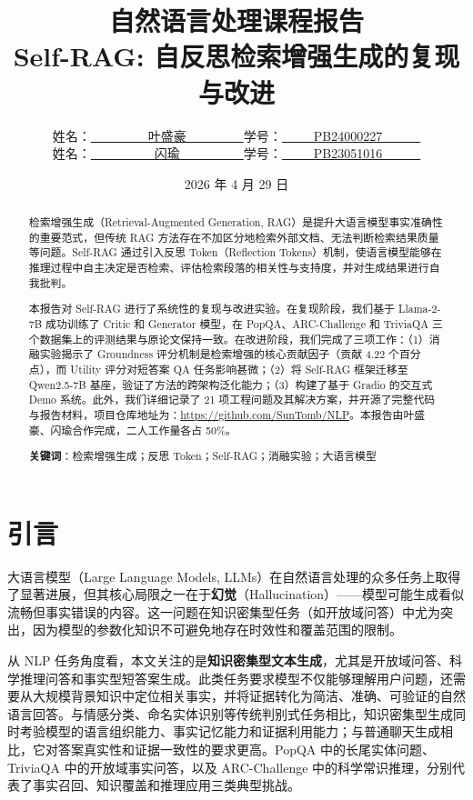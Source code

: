 \documentclass[11pt,a4paper]{article}
\title{\bf 自然语言处理课程报告\\[0.5em]
\Large Self-RAG: 自反思检索增强生成的复现与改进}
\author{\begin{tabular}{cc}
姓名：\underline{~~~~~~~~~叶盛豪~~~~~~~~~} & 学号：\underline{~~~~~PB24000227~~~~~~} \\
姓名：\underline{~~~~~~~~~~闪瑜~~~~~~~~~~} & 学号：\underline{~~~~~PB23051016~~~~~~}
\end{tabular}}
\date{2026 年 4 月 29 日}
\begin{document}
\maketitle

\begin{abstract}
检索增强生成（Retrieval-Augmented Generation, RAG）是提升大语言模型事实准确性的重要范式，但传统 RAG 方法存在不加区分地检索外部文档、无法判断检索结果质量等问题。Self-RAG 通过引入反思 Token（Reflection Tokens）机制，使语言模型能够在推理过程中自主决定是否检索、评估检索段落的相关性与支持度，并对生成结果进行自我批判。

本报告对 Self-RAG 进行了系统性的复现与改进实验。在复现阶段，我们基于 Llama-2-7B 成功训练了 Critic 和 Generator 模型，在 PopQA、ARC-Challenge 和 TriviaQA 三个数据集上的评测结果与原论文保持一致。在改进阶段，我们完成了三项工作：（1）消融实验揭示了 Groundness 评分机制是检索增强的核心贡献因子（贡献 4.22 个百分点），而 Utility 评分对短答案 QA 任务影响甚微；（2）将 Self-RAG 框架迁移至 Qwen2.5-7B 基座，验证了方法的跨架构泛化能力；（3）构建了基于 Gradio 的交互式 Demo 系统。此外，我们详细记录了 21 项工程问题及其解决方案，并开源了完整代码与报告材料，项目仓库地址为：\url{https://github.com/SunTomb/NLP}。本报告由叶盛豪、闪瑜合作完成，二人工作量各占 50\%。

\noindent\textbf{关键词}：检索增强生成；反思 Token；Self-RAG；消融实验；大语言模型
\end{abstract}

\section{引言}
\label{sec:intro}

大语言模型（Large Language Models, LLMs）在自然语言处理的众多任务上取得了显著进展，但其核心局限之一在于\textbf{幻觉}（Hallucination）——模型可能生成看似流畅但事实错误的内容。这一问题在知识密集型任务（如开放域问答）中尤为突出，因为模型的参数化知识不可避免地存在时效性和覆盖范围的限制。

从 NLP 任务角度看，本文关注的是\textbf{知识密集型文本生成}，尤其是开放域问答、科学推理问答和事实型短答案生成。此类任务要求模型不仅能够理解用户问题，还需要从大规模背景知识中定位相关事实，并将证据转化为简洁、准确、可验证的自然语言回答。与情感分类、命名实体识别等传统判别式任务相比，知识密集型生成同时考验模型的语言组织能力、事实记忆能力和证据利用能力；与普通聊天生成相比，它对答案真实性和证据一致性的要求更高。PopQA 中的长尾实体问题、TriviaQA 中的开放域事实问答，以及 ARC-Challenge 中的科学常识推理，分别代表了事实召回、知识覆盖和推理应用三类典型挑战。
\end{document}
